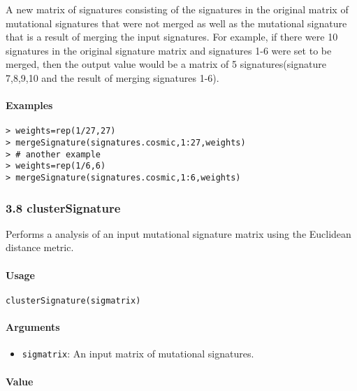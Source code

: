 \documentclass[]{article}
\providecommand{\tightlist}{%
  \setlength{\itemsep}{0pt}\setlength{\parskip}{0pt}}
\let\oldparagraph\paragraph
\renewcommand{\paragraph}[1]{\oldparagraph{#1}\mbox{}}
\begin{document}
A new matrix of signatures consisting of the signatures in the original
matrix of mutational signatures that were not merged as well as the
mutational signature that is a result of merging the input signatures.
For example, if there were 10 signatures in the original signature
matrix and signatures 1-6 were set to be merged, then the output value
would be a matrix of 5 signatures(signature 7,8,9,10 and the result of
merging signatures 1-6).

\paragraph{\texorpdfstring{\textbf{Examples}}{Examples}}\label{examples-6}

\begin{verbatim}
> weights=rep(1/27,27)      
> mergeSignature(signatures.cosmic,1:27,weights)
> # another example
> weights=rep(1/6,6)  
> mergeSignature(signatures.cosmic,1:6,weights)   
\end{verbatim}

\subsubsection{3.8 clusterSignature}\label{clustersignature}

Performs a  analysis of an input mutational
signature matrix using the Euclidean distance metric.

\paragraph{\texorpdfstring{\textbf{Usage}}{Usage}}\label{usage-7}

\texttt{clusterSignature(sigmatrix)}

\paragraph{\texorpdfstring{\textbf{Arguments
}}{Arguments }}\label{arguments-6}

\begin{itemize}
\tightlist
\item
  \texttt{sigmatrix}: An input matrix of mutational signatures.
\end{itemize}

\paragraph{\texorpdfstring{\textbf{Value}}{Value}}\label{value-5}
\end{document}
